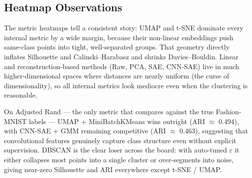 \subsection{Heatmap Observations}

The metric heatmaps tell a consistent story: UMAP and t-SNE dominate every internal metric
by a wide margin, because their non-linear embeddings push same-class points into tight,
well-separated groups. That geometry directly inflates Silhouette and Calinski--Harabasz and
shrinks Davies--Bouldin. Linear and reconstruction-based methods (Raw, PCA, SAE, CNN-SAE) live
in much higher-dimensional spaces where distances are nearly uniform (the curse of
dimensionality), so all internal metrics look mediocre even when the clustering is reasonable.

On Adjusted Rand --- the only metric that compares against the true Fashion-MNIST labels ---
UMAP + MiniBatchKMeans wins outright (ARI $\approx$ 0.494), with CNN-SAE + GMM remaining
competitive (ARI $\approx$ 0.463), suggesting that convolutional features genuinely capture
class structure even without explicit supervision. DBSCAN is the clear loser across the board:
with auto-tuned $\varepsilon$ it either collapses most points into a single cluster or
over-segments into noise, giving near-zero Silhouette and ARI everywhere except t-SNE / UMAP.

